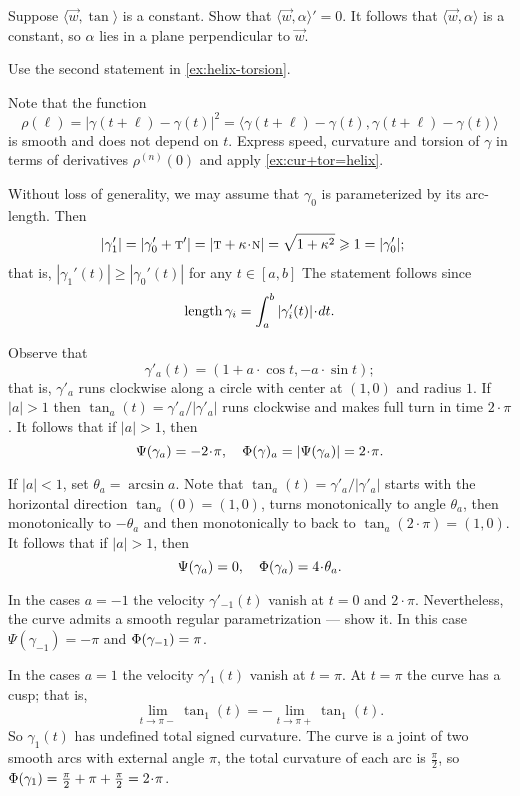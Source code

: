 Suppose $\langle \vec w,\tan\rangle$ is a constant.
Show that $\langle \vec w,\alpha\rangle'=0$.
It follows that $\langle \vec w,\alpha\rangle$ is a constant,
so $\alpha$ lies in a plane perpendicular to $\vec w$.


 Use the second statement in \ref{ex:helix-torsion}.

 Note that the function
\[\rho(\ell)=|\gamma(t+\ell)-\gamma(t)|^2=\langle \gamma(t+\ell)-\gamma(t),\gamma(t+\ell)-\gamma(t)\rangle\] 
is smooth and does not depend on $t$.
Express speed, curvature and torsion of $\gamma$ in terms of derivatives $\rho^{(n)}(0)$
and apply \ref{ex:cur+tor=helix}.

Without loss of generality, we may assume that $\gamma_0$ is parameterized by its arc-length.
Then
\begin{align*}
|\gamma_1'|&=|\gamma_0'+\tan'|=|\tan+\kur\cdot\norm|=
\sqrt{1+\kur^2}\ge
1=
|\gamma_0'|;
\end{align*}
that is, $|\gamma_1'(t)|\ge|\gamma_0'(t)|$ for any $t\in[a,b]$
The statement follows since 
\[\length\gamma_i
=
\int_a^b|\gamma_i'(t)|\cdot dt.\]

Observe that
\[\gamma'_a(t)=(1+a\cdot \cos t, -a\cdot \sin t);\]
that is, $\gamma'_a$ runs clockwise along a circle with center at $(1,0)$ and radius $1$.
If $|a|>1$ then $\tan_a(t)=\gamma'_a/|\gamma'_a|$ runs clockwise and makes full turn in time $2\cdot\pi$.
It follows that if $|a|>1$, then
\[\Psi(\gamma_a)=-2\cdot\pi,\quad \tc\gamma_a=|\Psi(\gamma_a)|=2\cdot\pi.\]

If $|a|<1$, set $\theta_a=\arcsin a$.
Note that $\tan_a(t)=\gamma'_a/|\gamma'_a|$ starts with the horizontal direction $\tan_a(0)=(1,0)$, turns monotonically to angle $\theta_a$, then monotonically to $-\theta_a$ and then monotonically to back to $\tan_a(2\cdot\pi)=(1,0)$.
It follows that if $|a|>1$, then
\[\Psi(\gamma_a)=0,\quad \tc{\gamma_a}=4\cdot\theta_a.\]

In the cases $a=-1$ the velocity $\gamma'_{-1}(t)$ vanish at $t=0$ and $2\cdot\pi$.
Nevertheless, the curve admits a smooth regular parametrization --- show it.
In this case $\Psi(\gamma_{-1})=-\pi$ and $\Phi({\gamma_{-1}})=\pi$.

In the cases $a=1$ the velocity $\gamma'_1(t)$ vanish at $t=\pi$.
At $t=\pi$ the curve has a cusp;
that is, 
\[\lim_{t\to\pi-}\tan_1(t)=-\lim_{t\to\pi+}\tan_1(t).\]
So $\gamma_1(t)$ has undefined total signed curvature.
The curve is a joint of two smooth arcs with external angle $\pi$,
the total curvature of each arc is $\tfrac\pi2$, so 
$\tc{\gamma_{1}}=\tfrac\pi2+\pi+\tfrac\pi2=2\cdot\pi$.


